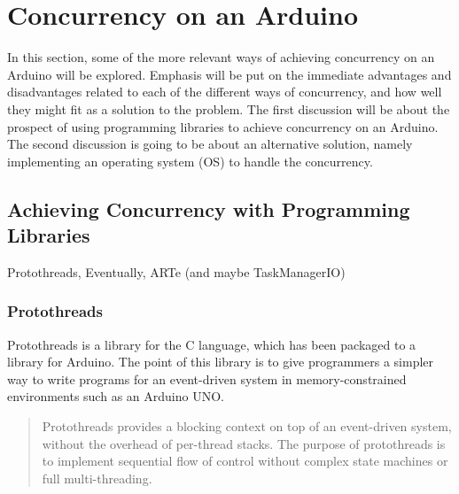 \section{Concurrency on an Arduino}\label{sec:concurrencyinarduino}

In this section, some of the more relevant ways of achieving concurrency on an Arduino will be explored. Emphasis will be put on the immediate advantages and disadvantages related to each of the different ways of concurrency, and how well they might fit as a solution to the problem. The first discussion will be about the prospect of using programming libraries to achieve concurrency on an Arduino. The second discussion is going to be about an alternative solution, namely implementing an operating system (OS) to handle the concurrency.


\subsection{Achieving Concurrency with Programming Libraries}
Protothreads, Eventually, ARTe (and maybe TaskManagerIO)


\subsubsection{Protothreads}
Protothreads is a library for the C language, which has been packaged to a library for Arduino. The point of this library is to give programmers a simpler way to write programs for an event-driven system in memory-constrained environments such as an Arduino UNO.

\blockcquote{Artin2020}{Protothreads provides a blocking context on top of an event-driven system, without the overhead of per-thread stacks. The purpose of protothreads is to implement sequential flow of control without complex state machines or full multi-threading.}

